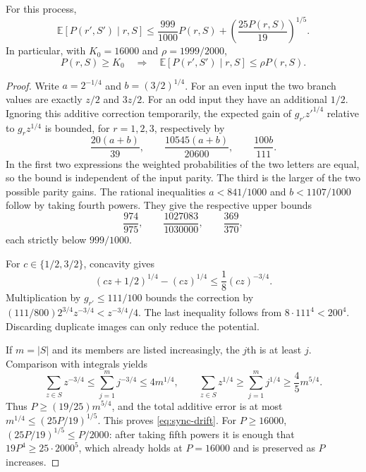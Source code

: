 \begin{lemma}\label{lem:protected-drift}
For this process,
\begin{equation}\label{eq:sync-drift}
 \mathbb E[P(r',S')\mid r,S]
 \le\frac{999}{1000}P(r,S)
    +\left(\frac{25P(r,S)}{19}\right)^{1/5}.
\end{equation}
In particular, with $K_0=16000$ and $\rho=1999/2000$,
\begin{equation}\label{eq:sync-geometric-drift}
 P(r,S)\ge K_0\quad\Longrightarrow\quad
 \mathbb E[P(r',S')\mid r,S]\le\rho P(r,S).
\end{equation}
\end{lemma}
\begin{proof}
Write $a=2^{-1/4}$ and $b=(3/2)^{1/4}$. For an even input the
two branch values are exactly $z/2$ and $3z/2$. For an odd input
they have an additional $1/2$. Ignoring this additive correction
temporarily, the expected gain of $g_{r'}z'^{1/4}$ relative to
$g_rz^{1/4}$ is bounded, for $r=1,2,3$, respectively by
\[
 \frac{20(a+b)}{39},\qquad
 \frac{10545(a+b)}{20600},\qquad
 \frac{100b}{111}.
\]
In the first two expressions the weighted probabilities of the two
letters are equal, so the bound is independent of the input parity.
The third is the larger of the two possible parity gains.
The rational inequalities $a<841/1000$ and $b<1107/1000$ follow
by taking fourth powers. They give the respective upper bounds
\[
 \frac{974}{975},\qquad
 \frac{1027083}{1030000},\qquad
 \frac{369}{370},
\]
each strictly below $999/1000$.

For $c\in\{1/2,3/2\}$, concavity gives
\[
 (cz+1/2)^{1/4}-(cz)^{1/4}
 \le\frac18(cz)^{-3/4}.
\]
Multiplication by $g_{r'}\le111/100$ bounds the correction by
$(111/800)2^{3/4}z^{-3/4}<z^{-3/4}/4$.
The last inequality follows from $8\cdot111^4<200^4$.
Discarding duplicate images can only reduce the potential.

If $m=|S|$ and its members are listed increasingly, the $j$th is
at least $j$. Comparison with integrals yields
\[
 \sum_{z\in S}z^{-3/4}
 \le\sum_{j=1}^{m}j^{-3/4}\le4m^{1/4},\qquad
 \sum_{z\in S}z^{1/4}\ge\sum_{j=1}^{m}j^{1/4}
 \ge\frac45m^{5/4}.
\]
Thus $P\ge(19/25)m^{5/4}$, and the total additive error is at
most $m^{1/4}\le(25P/19)^{1/5}$. This proves
\eqref{eq:sync-drift}. For $P\ge16000$,
$(25P/19)^{1/5}\le P/2000$: after taking fifth powers it is
enough that $19P^4\ge25\cdot2000^5$, which already holds at
$P=16000$ and is preserved as $P$ increases.
\end{proof}

